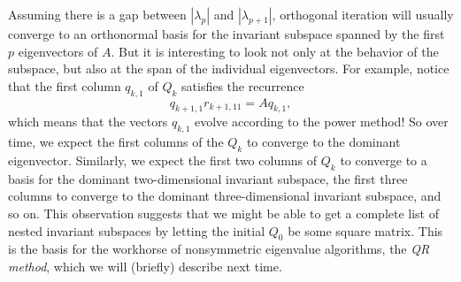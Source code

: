 \documentclass[12pt, leqno]{article}
\begin{document}
Assuming there is a gap between $|\lambda_{p}|$ and $|\lambda_{p+1}|$,
orthogonal iteration will usually converge to an orthonormal basis
for the invariant subspace spanned by the first $p$ eigenvectors of $A$.
But it is interesting to look not only at the behavior of the subspace,
but also at the span of the individual eigenvectors.  For example,
notice that the first column $q_{k,1}$ of $Q_k$ satisfies the recurrence
\[
  q_{k+1,1} r_{k+1,11} = A q_{k,1},
\]
which means that the vectors $q_{k,1}$ evolve according to the power method!
So over time, we expect the first columns of the $Q_k$ to converge to the
dominant eigenvector.  Similarly, we expect the first two columns of $Q_k$
to converge to a basis for the dominant two-dimensional invariant subspace,
the first three columns to converge to the dominant three-dimensional
invariant subspace, and so on.  This observation suggests that we might be
able to get a complete list of nested invariant subspaces by letting the
initial $Q_0$ be some square matrix.  This is the basis for the workhorse
of nonsymmetric eigenvalue algorithms, the {\em QR method}, which we will
(briefly) describe next time.
\end{document}
